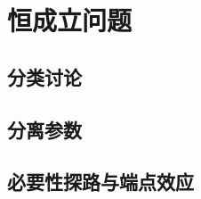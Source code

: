 \section{恒成立问题}
\subsection{分类讨论}
\clearpage
\subsection{分离参数}
\clearpage
\subsection{必要性探路与端点效应}

\clearpage
